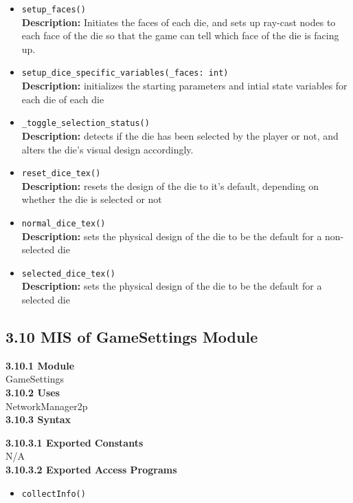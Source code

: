 \documentclass[12pt, titlepage]{article}
\begin{document}
\begin{itemize}
    \item \texttt{setup\_faces() }\\
	\textbf{Description:} Initiates the faces of each die, and sets up ray-cast nodes to each face of the die so that the game can tell which face of the die is facing up.
	\item \texttt{setup\_dice\_specific\_variables(\_faces: int) }\\
	\textbf{Description:} initializes the starting parameters and intial state variables for each die of each die 
	\item \texttt{\_toggle\_selection\_status() }\\
	\textbf{Description:} detects if the die has been selected by the player or not, and alters the die's visual design accordingly.
	\item \texttt{reset\_dice\_tex() }\\
	\textbf{Description:} resets the design of the die to it's default, depending on whether the die is selected or not
	\item \texttt{normal\_dice\_tex() }\\
	\textbf{Description:} sets the physical design of the die to be the default for a non-selected die
	\item \texttt{selected\_dice\_tex() }\\
	\textbf{Description:} sets the physical design of the die to be the default for a selected die	
	
	
\end{itemize}


\subsection*{3.10 MIS of GameSettings Module}
\textbf{3.10.1 Module}\\
 GameSettings\\

\noindent \textbf{3.10.2 Uses}\\
NetworkManager2p \\

\noindent \textbf{3.10.3 Syntax}

\noindent \textbf{3.10.3.1 Exported Constants}\\
N/A\\

\textbf{3.10.3.2 Exported Access Programs}
\begin{itemize}
	\item \texttt{collectInfo()}
	
	
\end{itemize}
\end{document}
